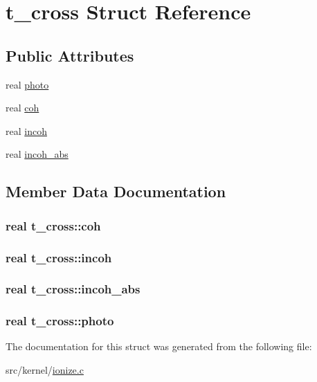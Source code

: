 \hypertarget{structt__cross}{\section{t\-\_\-cross \-Struct \-Reference}
\label{structt__cross}
}
\subsection*{\-Public \-Attributes}
\begin{DoxyCompactItemize}
\item 
real \hyperlink{structt__cross_a1e62aac28b16d307e4a375c8a61e27d0}{photo}
\item 
real \hyperlink{structt__cross_a4e985698a5edf49083a5a242d4c2dae5}{coh}
\item 
real \hyperlink{structt__cross_a9b0bb786cabac2bfe3a1baf8c96e2525}{incoh}
\item 
real \hyperlink{structt__cross_a4e5385f1f54b58dbed2a03b4a55eb408}{incoh\-\_\-abs}
\end{DoxyCompactItemize}


\subsection{\-Member \-Data \-Documentation}
\hypertarget{structt__cross_a4e985698a5edf49083a5a242d4c2dae5}{
\subsubsection[{coh}]{\setlength{\rightskip}{0pt plus 5cm}real {\bf t\-\_\-cross\-::coh}}}\label{structt__cross_a4e985698a5edf49083a5a242d4c2dae5}
\hypertarget{structt__cross_a9b0bb786cabac2bfe3a1baf8c96e2525}{
\subsubsection[{incoh}]{\setlength{\rightskip}{0pt plus 5cm}real {\bf t\-\_\-cross\-::incoh}}}\label{structt__cross_a9b0bb786cabac2bfe3a1baf8c96e2525}
\hypertarget{structt__cross_a4e5385f1f54b58dbed2a03b4a55eb408}{
\subsubsection[{incoh\-\_\-abs}]{\setlength{\rightskip}{0pt plus 5cm}real {\bf t\-\_\-cross\-::incoh\-\_\-abs}}}\label{structt__cross_a4e5385f1f54b58dbed2a03b4a55eb408}
\hypertarget{structt__cross_a1e62aac28b16d307e4a375c8a61e27d0}{
\subsubsection[{photo}]{\setlength{\rightskip}{0pt plus 5cm}real {\bf t\-\_\-cross\-::photo}}}\label{structt__cross_a1e62aac28b16d307e4a375c8a61e27d0}


\-The documentation for this struct was generated from the following file\-:\begin{DoxyCompactItemize}
\item 
src/kernel/\hyperlink{ionize_8c}{ionize.\-c}\end{DoxyCompactItemize}
